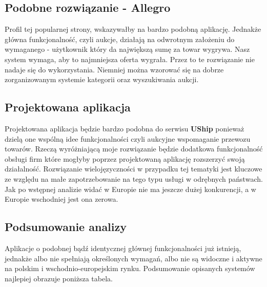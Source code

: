 \documentclass[10pt,titlepage]{article} %
\begin{document}
\subsection{Podobne rozwiązanie - Allegro}
Profil tej popularnej strony, wskazywałby na bardzo podobną aplikację. Jednakże główna funkcjonalność, czyli aukcje, działają na odwrotnym założeniu do wymaganego - użytkownik który da największą sumę za towar wygrywa. Nasz system wymaga, aby to najmniejsza oferta wygrała. Przez to te rozwiązanie nie nadaje się do wykorzystania. Niemniej można wzorować się na dobrze zorganizowanym systemie kategorii oraz wyszukiwania aukcji.

\subsection{Projektowana aplikacja}
Projektowana aplikacja będzie bardzo podobna do serwisu \textbf{UShip} ponieważ dzielą one wspólną idee funkcjonalności czyli aukcyjne wspomaganie przewozu towarów. Rzeczą wyróżniającą moje rozwiązanie będzie dodatkowa funkcjonalność obsługi firm które mogłyby poprzez projektowaną aplikację rozszerzyć swoją działalność.
Rozwiązanie wielojęzyczności w przypadku tej tematyki jest kluczowe ze względu na małe zapotrzebowanie na tego typu usługi w odrębnych państwach. Jak po wstępnej analizie widać w Europie nie ma jeszcze dużej konkurencji, a w Europie wschodniej jest ona zerowa.

\subsection{Podsumowanie analizy}
Aplikacje o podobnej bądź identycznej głównej funkcjonalności już istnieją, jednakże albo nie spełniają określonych wymagań, albo nie są widoczne i aktywne na polskim i wschodnio-europejskim rynku. Podsumowanie opisanych systemów najlepiej obrazuje poniższa tabela.
\end{document}
